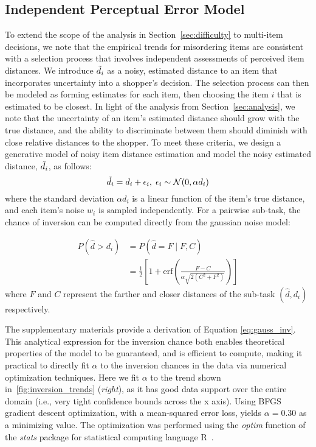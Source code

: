 \documentclass[aps,pre,twocolumn,groupedaddress]{revtex4-2}
\begin{document}
\subsection{Independent Perceptual Error Model\label{sec:independence}}
To extend the scope of the analysis in Section~\ref{sec:difficulty} to multi-item decisions, we note that the empirical trends for misordering items are consistent with a selection process that involves independent assessments of perceived item distances. We introduce $\Tilde{d}_{i}$ as a noisy, estimated distance to an item that incorporates uncertainty into a shopper's decision. The selection process can then be modeled as forming estimates for each item, then choosing the item $i$ that is estimated to be closest. In light of the analysis from Section~\ref{sec:analysis}, we note that the uncertainty of an item's estimated distance should grow with the true distance, and the ability to discriminate between them should diminish with close relative distances to the shopper. To meet these criteria, we design a generative model of noisy item distance estimation and model the noisy estimated distance, $\Tilde{d}_{i}$, as follows:
\begin{equation}
 \label{eq:gaussian_err}
  \Tilde{d}_{i} = d_{i} + \epsilon_{i},\; \epsilon_{i} \sim \mathcal{N}(0,\alpha d_{i})
\end{equation}
\noindent where the standard deviation $\alpha d_{i}$ is a linear function of the item's true distance, and each item's noise $w_{i}$ is sampled independently. For a pairwise sub-task, the chance of inversion can be computed directly from the gaussian noise model:

\begin{align}
P(\hat{d} > d_{i}) &= P(\hat{d} = F \;|\; F, C) \nonumber\\
 &= \frac{1}{2} 
 \left[ 
 1 + \text{erf}\left( 
 \frac{F - C}
 {\alpha \sqrt{2(C^2+F^2)}} 
 \right) 
 \right] 
\label{eq:gauss_inv}
\end{align}
\noindent where $F$ and $C$ represent the farther and closer distances of the sub-task $(\hat{d}, d_{i})$ respectively.

The supplementary materials provide a derivation of Equation \ref{eq:gauss_inv}. This analytical expression for the inversion chance both enables theoretical properties of the model to be guaranteed, and is efficient to compute, making it practical to directly fit $\alpha$ to the inversion chances in the data via numerical optimization techniques. Here we fit $\alpha$ to the trend shown in~\ref{fig:inversion_trends} (\textit{right}), as it has good data support over the entire domain (i.e., very tight confidence bounds across the x axis). Using BFGS gradient descent optimization, with a mean-squared error loss, yields $\alpha=0.30$ as a minimizing value. The optimization was performed using the \textit{optim} function of the \textit{stats} package for statistical computing language R~\cite{Rlanguage}.
\end{document}
